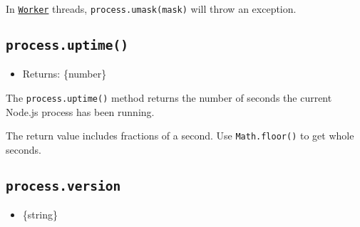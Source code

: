 \begin{Shaded}
\begin{Highlighting}[]
\OperatorTok{=} \NormalTok{(}\NormalTok{)}\OperatorTok{;}

\OperatorTok{=} \OperatorTok{;}
\OperatorTok{=} \OperatorTok{;}
\NormalTok{(}
  \SpecialCharTok{$\{}\NormalTok{(}\NormalTok{)}\SpecialCharTok{\}}\SpecialCharTok{$\{}\NormalTok{(}\NormalTok{)}\SpecialCharTok{\}}\VerbatimStringTok{\textasciigrave{}}\OperatorTok{,}
\NormalTok{)}\OperatorTok{;}
\end{Highlighting}
\end{Shaded}

In \href{worker_threads.md\#class-worker}{\texttt{Worker}} threads,
\texttt{process.umask(mask)} will throw an exception.

\subsection{\texorpdfstring{\texttt{process.uptime()}}{process.uptime()}}\label{process.uptime}

\begin{itemize}
\tightlist
\item
  Returns: \{number\}
\end{itemize}

The \texttt{process.uptime()} method returns the number of seconds the
current Node.js process has been running.

The return value includes fractions of a second. Use
\texttt{Math.floor()} to get whole seconds.

\subsection{\texorpdfstring{\texttt{process.version}}{process.version}}\label{process.version}

\begin{itemize}
\tightlist
\item
  \{string\}
\end{itemize}


